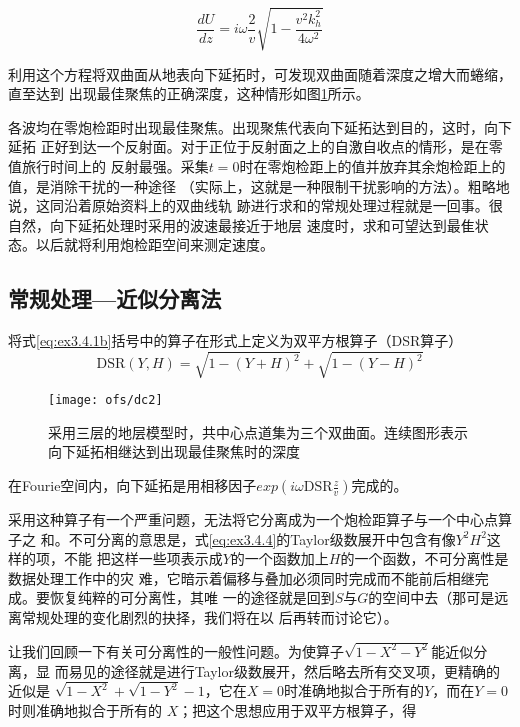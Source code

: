 \begin{equation}
\frac{dU}{dz}=i\omega\frac{2}{v}\sqrt{1-\frac{v^2k_h^2}{4\omega^2}}
\label{eq:ex3.4.3}
\end{equation}

利用这个方程将双曲面从地表向下延拓时，可发现双曲面随着深度之增大而蜷缩，直至达到
出现最佳聚焦的正确深度，这种情形如图\ref{fig:ofs/dc2}所示。

各波均在零炮检距时出现最佳聚焦。出现聚焦代表向下延拓达到目的，这时，向下延拓
正好到达一个反射面。对于正位于反射面之上的自激自收点的情形，是在零值旅行时间上的
反射最强。采集$t=0$时在零炮检距上的值并放弃其余炮检距上的值，是消除干扰的一种途径
（实际上，这就是一种限制干扰影响的方法）。粗略地说，这同沿着原始资料上的双曲线轨
跡进行求和的常规处理过程就是一回事。很自然，向下延拓处理时采用的波速最接近于地层
速度时，求和可望达到最隹状态。以后就将利用炮检距空间来测定速度。


\subsection{常规处理---近似分离法}
\label{sec:3.4.3}

将式\ref{eq:ex3.4.1b}括号中的算子在形式上定义为双平方根算子（DSR算子）
\begin{equation}
\text{DSR}(Y,H)=\sqrt{1-(Y+H)^2}+\sqrt{1-(Y-H)^2}
\label{eq:ex3.4.4}
\end{equation}

\begin{figure}[H]
\centering
\texttt{[image: ofs/dc2]}
\caption[chervon]{采用三层的地层模型时，共中心点道集为三个双曲面。连续图形表示
向下延拓相继达到出现最佳聚焦时的深度}
\label{fig:ofs/dc2}
\end{figure}

在Fourie空间内，向下延拓是用相移因子$exp(i\omega \text{DSR}\frac{z}{v})$完成的。

采用这种算子有一个严重问题，无法将它分离成为一个炮检距算子与一个中心点算子之
和。不可分离的意思是，式\ref{eq:ex3.4.4}的Taylor级数展开中包含有像$Y^2H^2$这样的项，不能
把这样一些项表示成$Y$的一个函数加上$H$的一个函数，不可分离性是数据处理工作中的灾
难，它暗示着偏移与叠加必须同时完成而不能前后相继完成。要恢复纯粹的可分离性，其唯
一的途径就是回到$S$与$G$的空间中去（那可是远离常规处理的变化剧烈的抉择，我们将在以
后再转而讨论它）。

让我们回顾一下有关可分离性的一般性问题。为使算子$\sqrt{1-X^2-Y^2}$能近似分离，显
而易见的途径就是进行Taylor级数展开，然后略去所有交叉项，更精确的近似是
$\sqrt{1-X^2}+\sqrt{1-Y^2}-1$，它在$X=0$时准确地拟合于所有的$Y$，而在$Y=0$时则准确地拟合于所有的
$X$；把这个思想应用于双平方根算子，得

